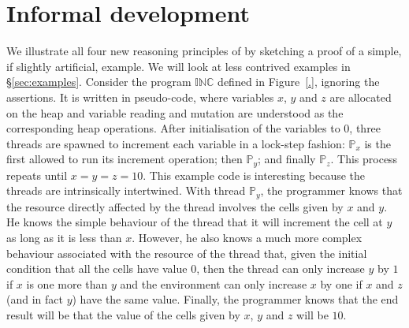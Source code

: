 \section{Informal development}
\label{sec:intuition}

We illustrate all four new reasoning principles of \colosl by
sketching a proof of a simple, if slightly artificial, example.  We will look
at less contrived examples in \S\ref{sec:examples}. Consider the
program $\mathbb{INC}$ defined in Figure~\ref{.}, ignoring the
assertions. It is written in pseudo-code, where variables $x$, $y$ and
$z$ are allocated on the heap and variable reading and mutation are
understood as the corresponding heap operations. After initialisation
of the variables to $0$, three threads are spawned to increment each
variable in a lock-step fashion: $\mathbb{P}_x$ is the first allowed
to run its increment operation; then $\mathbb{P}_y$; and finally
$\mathbb{P}_z$. This process repeats until $x = y = z = 10$.  This
example code is interesting because the threads are intrinsically
intertwined. With thread $\mathbb{P}_y$, the programmer
knows that the resource directly affected by the thread involves the cells
given by $x$ and $y$. He knows the 
simple  behaviour of the thread that 
 it will increment the cell at $y$ as long as it is less than $x$.
However, he also knows a
much more complex  behaviour associated with the resource of  the thread that,  given the initial
 condition that all the cells have value $0$, then the thread can only
 increase  $y$ by $1$ if 
$x$ is  one more than $y$  and the environment can only  increase
$x$ by one if 
$x$ and $z$ (and in fact  $y$) have the same value. Finally, the
programmer knows that the end result will be that the value of the
cells given by $x$, $y$ and $z$ will be $10$. 





